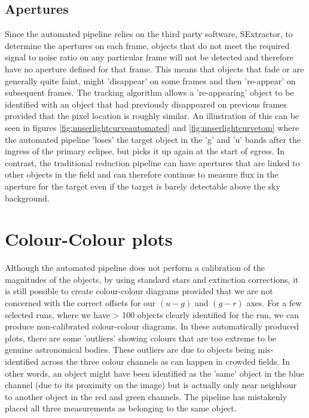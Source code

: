 \subsection{Apertures}
Since the automated pipeline relies on the third party software, SExtractor, to determine the apertures on each frame, objects that do not meet the required signal to noise ratio on any particular frame will not be detected and therefore have no aperture defined for that frame. This means that objects that fade or are generally quite faint, might 'disappear' on some frames and then 're-appear' on subsequent frames. The tracking algorithm allows a 're-appearing' object to be identified with an object that had previously disappeared on previous frames provided that the pixel location is roughly similar. An illustration of this can be seen in figures \ref{fig:nnserlightcurveautomated} and \ref{fig:nnserlightcurvetom} where the automated pipeline 'loses' the target object in the 'g' and 'u' bands after the ingress of the primary eclipse, but picks it up again at the start of egress. In contrast, the traditional reduction pipeline can have apertures that are linked to other objects in the field and can therefore continue to measure flux in the aperture for the target even if the target is barely detectable above the sky background.

\section{Colour-Colour plots}
Although the automated pipeline does not perform a calibration of the magnitudes of the objects, by using standard stars and extinction corrections, it is still possible to create colour-colour diagrams provided that we are not concerned with the correct offsets for our $(u-g)$ and $(g-r)$ axes. For a few selected runs, where we have > 100 objects clearly identified for the run, we can produce non-calibrated colour-colour diagrams. In these automatically produced plots, there are some 'outliers' showing colours that are too extreme to be genuine astronomical bodies. These outliers are due to objects being mis-identified across the three colour channels as can happen in crowded fields. In other words, an object might have been identified as the 'same' object in the blue channel (due to its proximity on the image) but is actually only near neighbour to another object in the red and green channels. The pipeline has mistakenly placed all three measurements as belonging to the same object. 

